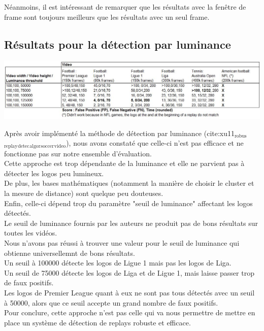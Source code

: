 \documentclass[11pt]{article}
\begin{document}
Néanmoins, il est intéressant de remarquer que les résultats avec la fenêtre de frame sont toujours meilleurs que les résultats avec un seul frame.\\
\subsection{Résultats pour la détection par luminance}
\label{sec:org976d628}
\begin{center}
\includegraphics[width=15cm]{robust_res.JPG}
\end{center}
Après avoir implémenté la méthode de détection par luminance (cite:xu11\(_{\text{robus}}\)\(_{\text{replay}}\)\(_{\text{detec}}\)\(_{\text{algor}}\)\(_{\text{soccer}}\)\(_{\text{video}}\)), nous avons constaté que celle-ci n'est pas efficace et ne fonctionne pas sur notre ensemble d'évaluation.\\
Cette approche est trop dépendante de la luminance et elle ne parvient pas à détecter les logos peu lumineux.\\
De plus, les bases mathématiques (notamment la manière de choisir le cluster et la mesure de distance) sont quelque peu douteuses.\\
Enfin, celle-ci dépend trop du paramètre "seuil de luminance" affectant les logos détectés.\\
Le seuil de luminance fournis par les auteurs ne produit pas de bons résultats sur toutes les vidéos.\\
Nous n'avons pas réussi à trouver une valeur pour le seuil de luminance qui obtienne universellemnt de bons résultats.\\
Un seuil à 100000 détecte les logos de Ligue 1 mais pas les logos de Liga.\\
Un seuil de 75000 détecte les logos de Liga et de Ligue 1, mais laisse passer trop de faux positifs.\\
Les logos de Premier League quant à eux ne sont pas tous détectés avec un seuil à 50000, alors que ce seuil accepte un grand nombre de faux positifs.\\

Pour conclure, cette approche n'est pas celle qui va nous permettre de mettre en place un système de détection de replays robuste et efficace.\\
\end{document}
